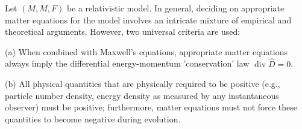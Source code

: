 Let $(M, M, F)$ be a relativistic model. In general, deciding on appropriate matter equations for the model involves an intricate mixture of empirical and theoretical arguments. However, two universal criteria are used:

(a) When combined with Maxwell's equations, appropriate matter equations always imply the differential energy-momentum 'conservation' law $\operatorname{div} \hat{D} = 0$.

(b) All physical quantities that are physically required to be positive (e.g., particle number density, energy density as measured by any instantaneous observer) must be positive; furthermore, matter equations must not force these quantities to become negative during evolution.
